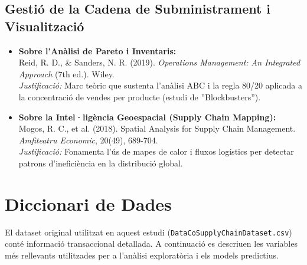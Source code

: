 \documentclass[12pt,a4paper]{article}
\begin{document}
\subsection*{Gestió de la Cadena de Subministrament i Visualització}

\begin{itemize}
    \item \textbf{Sobre l'Anàlisi de Pareto i Inventaris:} \\
    Reid, R. D., \& Sanders, N. R. (2019). \textit{Operations Management: An Integrated Approach} (7th ed.). Wiley. \\
    \textit{Justificació:} Marc teòric que sustenta l'anàlisi ABC i la regla 80/20 aplicada a la concentració de vendes per producte (estudi de ''Blockbusters'').

    \item \textbf{Sobre la Intel·ligència Geoespacial (Supply Chain Mapping):} \\
    Mogos, R. C., et al. (2018). Spatial Analysis for Supply Chain Management. \textit{Amfiteatru Economic}, 20(49), 689-704. \\
    \textit{Justificació:} Fonamenta l'ús de mapes de calor i fluxos logístics per detectar patrons d'ineficiència en la distribució global.
\end{itemize}


\appendix
\section{Diccionari de Dades}
\label{app:data_dictionary}

El dataset original utilitzat en aquest estudi (\texttt{DataCoSupplyChainDataset.csv}) conté informació transaccional detallada. A continuació es descriuen les variables més rellevants utilitzades per a l'anàlisi exploratòria i els models predictius.
\end{document}
